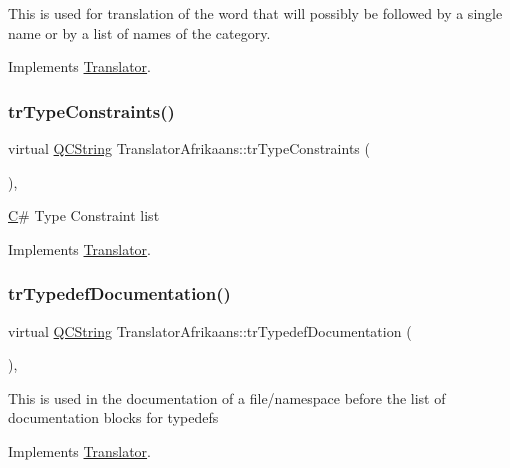 This is used for translation of the word that will possibly be followed by a single name or by a list of names of the category. 

Implements \mbox{\hyperlink{class_translator}{Translator}}.

\mbox{\label{class_translator_afrikaans_a4590414708d6390281d1f859f4b5c68f}} 
\subsubsection{\texorpdfstring{trTypeConstraints()}{trTypeConstraints()}}
{\footnotesize\ttfamily virtual \mbox{\hyperlink{class_q_c_string}{Q\+C\+String}} Translator\+Afrikaans\+::tr\+Type\+Constraints (\begin{DoxyParamCaption}{ }\end{DoxyParamCaption})\hspace{0.3cm}{\ttfamily [inline]}, {\ttfamily [virtual]}}

\mbox{\hyperlink{class_c}{C}}\# Type Constraint list 

Implements \mbox{\hyperlink{class_translator}{Translator}}.

\mbox{\label{class_translator_afrikaans_a0c885541d6d328849f1b423a5ee8ab59}} 
\subsubsection{\texorpdfstring{trTypedefDocumentation()}{trTypedefDocumentation()}}
{\footnotesize\ttfamily virtual \mbox{\hyperlink{class_q_c_string}{Q\+C\+String}} Translator\+Afrikaans\+::tr\+Typedef\+Documentation (\begin{DoxyParamCaption}{ }\end{DoxyParamCaption})\hspace{0.3cm}{\ttfamily [inline]}, {\ttfamily [virtual]}}

This is used in the documentation of a file/namespace before the list of documentation blocks for typedefs 

Implements \mbox{\hyperlink{class_translator}{Translator}}.

